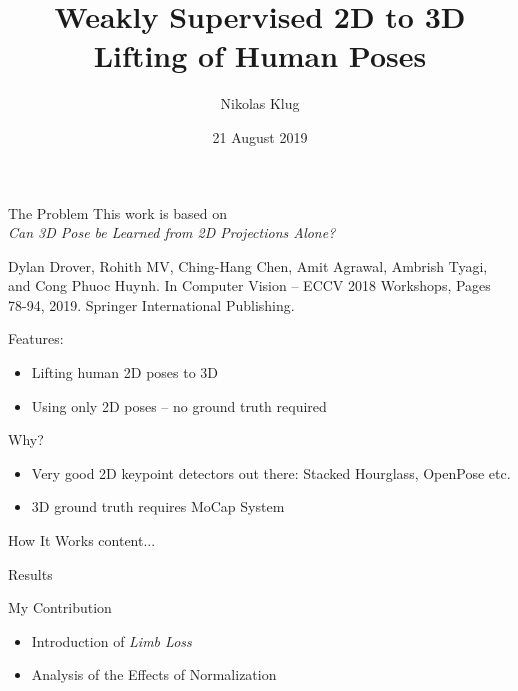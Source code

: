 \documentclass[8pt]{beamer}
\title[]{Weakly Supervised 2D to 3D Lifting of Human Poses}
\author[Nikolas Klug]{Nikolas Klug}
\institute[University of Augsburg]{University of Augsburg}
\date{21 August 2019}
\begin{document}
	\frame{\titlepage}
	
	\begin{frame}[t]{The Problem}
		This work is based on \\
		\vspace{5pt}
		\emph{Can 3D Pose be Learned from 2D Projections Alone?}\linebreak
		\begin{footnotesize}
			Dylan Drover, Rohith MV, Ching-Hang Chen, Amit Agrawal, Ambrish Tyagi, and Cong Phuoc Huynh.\linebreak
			In Computer Vision -- ECCV 2018 Workshops, Pages 78-94, 2019. Springer International Publishing.\par
		\end{footnotesize}
		\vspace{2cm}
		Features:
		\begin{itemize}
			\item Lifting human 2D poses to 3D
			\item Using only 2D poses -- no ground truth required
		\end{itemize}
	\end{frame}

	\begin{frame}{Why?}
		\begin{itemize}
			\item Very good 2D keypoint detectors out there: Stacked Hourglass, OpenPose etc.
			\item 3D ground truth requires MoCap System
		\end{itemize}
	\end{frame}

	\begin{frame}{How It Works}
		content...
	\end{frame}

	\begin{frame}{Results}
		
	\end{frame}
	
	\begin{frame}{My Contribution}
		\begin{itemize}
			\item Introduction of \emph{Limb Loss}
			\item Analysis of the Effects of Normalization
		\end{itemize}
	\end{frame}
	
	
\end{document}
